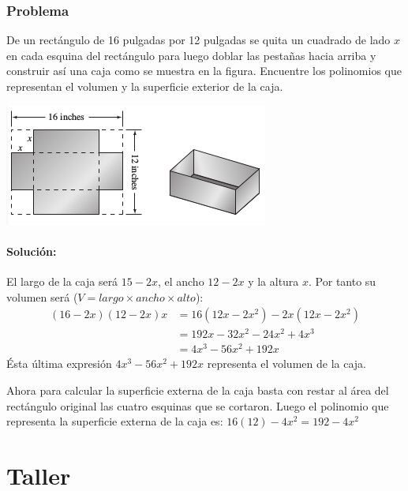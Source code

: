 \documentclass[10pt,twoside]{article}
\begin{document}
\subsubsection*{Problema}
De un rectángulo de 16 pulgadas por 12 pulgadas se quita un cuadrado de lado $x$ en cada esquina del rectángulo para luego doblar las pestañas hacia arriba y construir así una caja como se muestra en la figura. Encuentre los polinomios que representan el volumen y la superficie exterior de la caja.
\begin{center}
\includegraphics[scale=.75]{Images/caja_12in.png} 
\end{center}
\paragraph*{Solución:}

El largo de la caja será $15-2x$, el ancho $12-2x$ y la altura $x$. Por tanto su volumen será ($V=largo\times ancho \times alto$):
\begin{align*}
(16-2x)(12-2x)x&=16(12x-2x^2)-2x(12x-2x^2)\\
&=192x-32x^2-24x^2+4x^3\\
&=4x^3-56x^2+192x
\end{align*}
Ésta última expresión $4x^3-56x^2+192x$ representa el volumen de la caja.

Ahora para calcular la superficie externa de la caja basta con restar al área del rectángulo original las cuatro esquinas que se cortaron. Luego el polinomio que representa la superficie externa de la caja es: 
$16(12)-4x^2=192-4x^2$
\section*{Taller}
\end{document}
